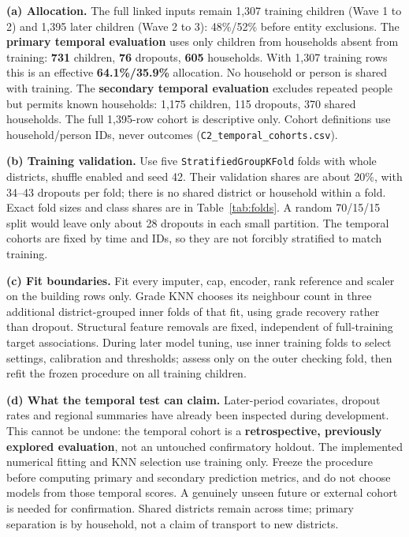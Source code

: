 \documentclass[conference,a4paper]{IEEEtran}
\newcommand{\var}[1]{\texttt{#1}}
\begin{document}
\textbf{(a) Allocation.} The full linked inputs remain 1,307 training children (Wave 1 to 2) and 1,395 later children (Wave 2 to 3): 48\%/52\% before entity exclusions. The \textbf{primary temporal evaluation} uses only children from households absent from training: \textbf{731} children, \textbf{76} dropouts, \textbf{605} households. With 1,307 training rows this is an effective \textbf{64.1\%/35.9\%} allocation. No household or person is shared with training. The \textbf{secondary temporal evaluation} excludes repeated people but permits known households: 1,175 children, 115 dropouts, 370 shared households. The full 1,395-row cohort is descriptive only. Cohort definitions use household/person IDs, never outcomes (\var{C2\_temporal\_cohorts.csv}).

\textbf{(b) Training validation.} Use five \var{StratifiedGroupKFold} folds with whole districts, shuffle enabled and seed 42. Their validation shares are about 20\%, with 34--43 dropouts per fold; there is no shared district or household within a fold. Exact fold sizes and class shares are in Table~\ref{tab:folds}. A random 70/15/15 split would leave only about 28 dropouts in each small partition. The temporal cohorts are fixed by time and IDs, so they are not forcibly stratified to match training.

\textbf{(c) Fit boundaries.} Fit every imputer, cap, encoder, rank reference and scaler on the building rows only. Grade KNN chooses its neighbour count in three additional district-grouped inner folds of that fit, using grade recovery rather than dropout. Structural feature removals are fixed, independent of full-training target associations. During later model tuning, use inner training folds to select settings, calibration and thresholds; assess only on the outer checking fold, then refit the frozen procedure on all training children.

\textbf{(d) What the temporal test can claim.} Later-period covariates, dropout rates and regional summaries have already been inspected during development. This cannot be undone: the temporal cohort is a \textbf{retrospective, previously explored evaluation}, not an untouched confirmatory holdout. The implemented numerical fitting and KNN selection use training only. Freeze the procedure before computing primary and secondary prediction metrics, and do not choose models from those temporal scores. A genuinely unseen future or external cohort is needed for confirmation. Shared districts remain across time; primary separation is by household, not a claim of transport to new districts.
\end{document}
